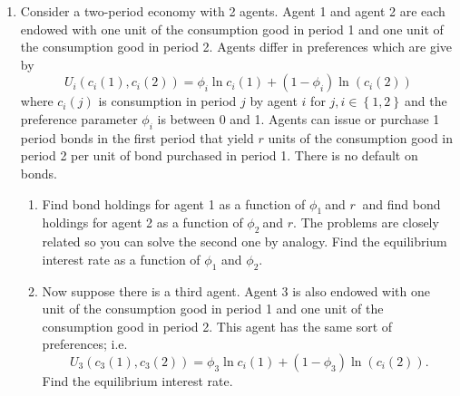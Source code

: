 \documentclass{article}
\begin{document}
\begin{enumerate}
\begin{enumerate}
\item An economist has taken Econ 905 and recognizes that the competitive
equilibrium is inefficient. She proposes to subsidize the return to savings
so that the representative agent receives a return of $r\left( 1+\varsigma
\right) $ per unit of capital rented to the firm rather than $r$ where $r$
is the rental price of capital paid by the firm and $\varsigma r$ is the
subsidy paid by the government per unit of capital. This subsidy is to be
funded with a lump tax, $\tilde{\tau}$, in the second period on the
representative agent (no taxes while young). While the agent takes $\tilde{%
\tau}$ as given, this is proportional to output in equilibrium so in
equilibrium $\tilde{\tau}=\tau y.$ What is the optimal extent of this
policy? That is, how should the government set $\tau $ and $\varsigma \ $if
it wishes to maximize the utility of the representative agent?
\end{enumerate}

\item Consider a two-period economy with 2 agents. Agent 1 and agent 2 are
each endowed with one unit of the consumption good in period 1 and one unit
of the consumption good in period 2. Agents differ in preferences which are
give by%
\begin{equation*}
U_{i}\left( c_{i}\left( 1\right) ,c_{i}\left( 2\right) \right) =\phi _{i}\ln
c_{i}\left( 1\right) +\left( 1-\phi _{i}\right) \ln \left( c_{i}\left(
2\right) \right)
\end{equation*}%
where $c_{i}\left( j\right) $ is consumption in period $j$ by agent $i$ for $%
j,i\in \left\{ 1,2\right\} \ $and the preference parameter $\phi _{i}$ is
between 0 and 1. Agents can issue or purchase 1 period bonds in the first
period that yield $r$ units of the consumption good in period 2 per unit of
bond purchased in period 1. There is no default on bonds.

\begin{enumerate}
\item Find bond holdings for agent 1 as a function of $\phi _{1}\ $and $r\ $%
and find bond holdings for agent 2 as a function of $\phi _{2}\ $and $r.$
The problems are closely related so you can solve the second one by analogy.
Find the equilibrium interest rate as a function of $\phi _{1}$ and $\phi
_{2}.$

\item Now suppose there is a third agent. Agent 3 is also endowed with one
unit of the consumption good in period 1 and one unit of the consumption
good in period 2. This agent has the same sort of preferences; i.e.%
\begin{equation*}
U_{3}\left( c_{3}\left( 1\right) ,c_{3}\left( 2\right) \right) =\phi _{3}\ln
c_{i}\left( 1\right) +\left( 1-\phi _{3}\right) \ln \left( c_{i}\left(
2\right) \right) .
\end{equation*}%
Find the equilibrium interest rate.

\pagebreak
\end{enumerate}
\end{enumerate}
\end{document}
